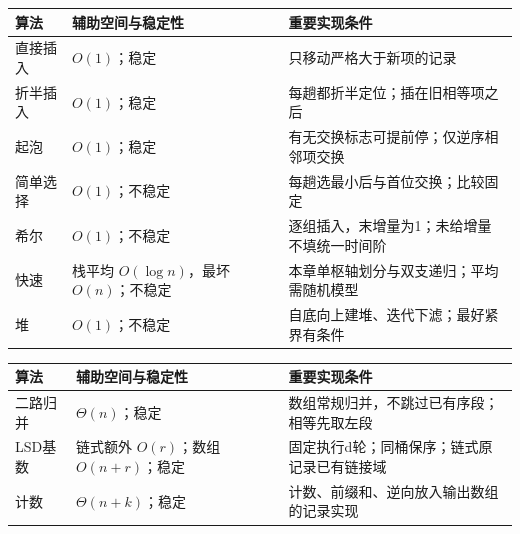 \begin{wideblock}

\par\medskip\noindent\begin{minipage}{\linewidth}\fontsize{9.3}{12}\selectfont\begin{tabularx}{\linewidth}{@{}YYY@{}}
\toprule\noalign{}
\begin{minipage}[b]{\linewidth}\raggedright
算法
\end{minipage} & \begin{minipage}[b]{\linewidth}\raggedright
辅助空间与稳定性
\end{minipage} & \begin{minipage}[b]{\linewidth}\raggedright
重要实现条件
\end{minipage} \\
\midrule\noalign{}


直接插入 & \(O(1)\)；稳定 & 只移动严格大于新项的记录 \\
折半插入 & \(O(1)\)；稳定 & 每趟都折半定位；插在旧相等项之后 \\
起泡 & \(O(1)\)；稳定 & 有无交换标志可提前停；仅逆序相邻项交换 \\
简单选择 & \(O(1)\)；不稳定 & 每趟选最小后与首位交换；比较固定 \\
希尔 & \(O(1)\)；不稳定 & 逐组插入，末增量为1；未给增量不填统一时间阶 \\
快速 & 栈平均 \(O(\log n)\)，最坏 \(O(n)\)；不稳定 & 本章单枢轴划分与双支递归；平均需随机模型 \\
堆 & \(O(1)\)；不稳定 & 自底向上建堆、迭代下滤；最好紧界有条件 \\
\bottomrule\end{tabularx}
\end{minipage}\par\medskip

\par\medskip\noindent\begin{minipage}{\linewidth}\fontsize{9.3}{12}\selectfont\begin{tabularx}{\linewidth}{@{}YYY@{}}
\toprule\noalign{}
\begin{minipage}[b]{\linewidth}\raggedright
算法
\end{minipage} & \begin{minipage}[b]{\linewidth}\raggedright
辅助空间与稳定性
\end{minipage} & \begin{minipage}[b]{\linewidth}\raggedright
重要实现条件
\end{minipage} \\
\midrule\noalign{}


二路归并 & \(\Theta(n)\)；稳定 & 数组常规归并，不跳过已有序段；相等先取左段 \\
LSD基数 & 链式额外 \(O(r)\)；数组 \(O(n+r)\)；稳定 & 固定执行d轮；同桶保序；链式原记录已有链接域 \\
计数 & \(\Theta(n+k)\)；稳定 & 计数、前缀和、逆向放入输出数组的记录实现 \\
\bottomrule\end{tabularx}
\end{minipage}\par\medskip

\end{wideblock}

